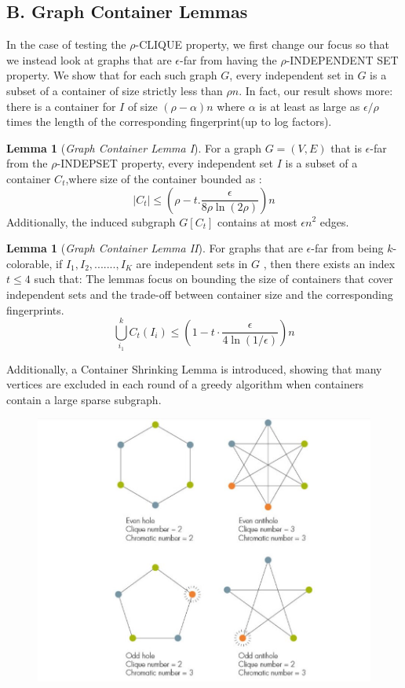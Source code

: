 \documentclass[preprint,11pt]{elsarticle}
\theoremstyle{definition}
\newtheorem{lemma}[theorem]{Lemma}
\begin{document}
\begin{multicols}{2}
\subsection*{\textbf{B. Graph Container Lemmas}} 
In the case of testing the $\rho$-CLIQUE property, we first change our focus so that we instead look at graphs that are $\epsilon$-far from having the $\rho$-INDEPENDENT SET property. We show that for each such graph $G$, every independent set in $G$ is a subset of a container
of size strictly less than $\rho n$. In fact, our result shows more:
there is a container for $I$ of size $(\rho-\alpha)n$ where $\alpha$ is at least as large as $\epsilon/\rho$ times the length of the corresponding fingerprint(up to log factors).
\begin{lemma}[\textit{Graph Container Lemma I}]
For a graph $G=(V,E)$ that is $\epsilon$-far from the $\rho$-INDEPSET property, every independent set $I$ is a subset of a container $C_t$,where size of the  container bounded as :
\begin{equation}
|C_t|\leq(\rho-t.\frac{\epsilon}{{8\rho\ln(2\rho)}})n
\tag{2}
\end{equation}
Additionally, the induced subgraph $G[C_t]$ contains at most $\epsilon n^2$ edges.
\end{lemma}
\begin{lemma}[\textit{Graph Container Lemma II}]
For graphs that are $\epsilon$-far from being $k$-colorable, if $I_1,I_2,.......,I_K$ are independent sets in $G$ , then there exists an index $t\leq 4$ such that:
The lemmas focus on bounding the size of containers that cover independent sets and the trade-off between container size and the corresponding fingerprints. 
\begin{equation}
\bigcup_{i_1}^{k} C_t(I_i)\leq (1-t\cdot{\frac{\epsilon}{4\ln(1/\epsilon)}})n
\tag{3}
\end{equation}
\end{lemma}
Additionally, a Container Shrinking Lemma  is introduced, showing that many vertices are excluded in each round of a greedy algorithm when containers contain a large sparse subgraph.
\begin{figure}[t]
    \centering
    \includegraphics[scale=0.4]{images/graphproperty.jpg}

\end{figure}
\end{multicols}
\end{document}
